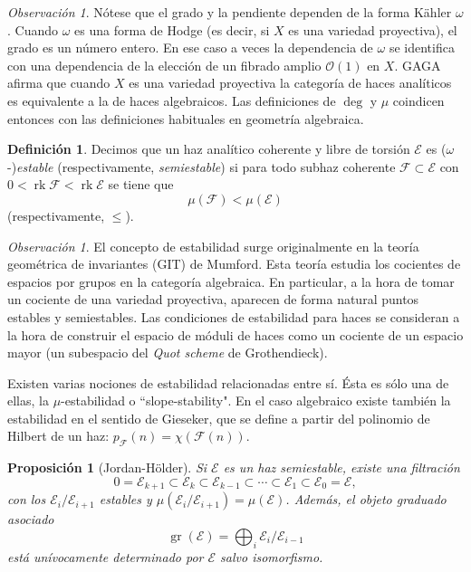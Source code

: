 \documentclass[12pt, a4paper]{amsart}
\newcommand\FF{\mathscr{F}}
\newcommand\EE{\mathscr{E}}
\newcommand\OO{\mathscr{O}}
\DeclareMathOperator\gr{gr}
\DeclareMathOperator\rk{rk}
\newtheorem{prop}[thm]{Proposición}
\theoremstyle{remark} \newtheorem{rmk}[thm]{Observación}
\theoremstyle{remark} \newtheorem{rmks}[thm]{Observaciones}
\theoremstyle{definition} \newtheorem{defn}[thm]{Definición}
\theoremstyle{definition} \newtheorem{ejs}[thm]{Ejemplos}
\theoremstyle{definition} \newtheorem{ej}[thm]{Ejemplo}
\begin{document}
\begin{rmk}
	Nótese que el grado y la pendiente dependen de la forma Kähler $\omega$. Cuando $\omega$ es una forma de Hodge  (es decir, si $X$ es una variedad proyectiva), el grado es un número entero. En ese caso a veces la dependencia de $\omega$ se identifica con una dependencia de la elección de un fibrado amplio $\OO(1)$ en $X$. GAGA afirma que cuando $X$ es una variedad proyectiva la categoría de haces analíticos es equivalente a la de haces algebraicos. Las definiciones de $\deg$ y $\mu$ coindicen entonces con las definiciones habituales en geometría algebraica.
\end{rmk}

\begin{defn}
	Decimos que un haz analítico coherente y libre de torsión $\EE$ es  ($\omega$-)\emph{estable} (respectivamente, \emph{semiestable}) si para todo subhaz coherente $\FF \subset \EE$ con  $0<\rk \FF < \rk \EE$ se tiene que
	 \begin{equation*}
		 \mu(\FF)< \mu(\EE)
	\end{equation*} 
	(respectivamente, $\leq$).
\end{defn}

\begin{rmk}
	El concepto de estabilidad surge originalmente en la teoría geométrica de invariantes (GIT) de Mumford. Esta teoría estudia los cocientes de espacios por grupos en la categoría algebraica. En particular, a la hora de tomar un cociente de una variedad proyectiva, aparecen de forma natural puntos estables y semiestables. Las condiciones de estabilidad para haces se consideran a la hora de construir el espacio de móduli de haces como un cociente de un espacio mayor (un subespacio del \emph{Quot scheme} de Grothendieck).

	Existen varias nociones de estabilidad relacionadas entre sí. Ésta es sólo una de ellas, la $\mu$-estabilidad o ``slope-stability". En el caso algebraico existe también la estabilidad en el sentido de Gieseker, que se define a partir del polinomio de Hilbert de un haz: $p_\FF(n)=\chi(\FF(n))$. 
\end{rmk}
		
\begin{prop}[Jordan-Hölder]
	Si $\EE$ es un haz semiestable, existe una filtración
	\begin{equation*}
	0=\EE_{k+1}\subset \EE_k \subset \EE_{k-1}\subset \cdots \subset \EE_1 \subset \EE_0=\EE,
	\end{equation*} 
	con los $\EE_i/\EE_{i+1}$ estables y $\mu(\EE_i/\EE_{i+1})=\mu(\EE)$. Además, el \emph{objeto graduado asociado}
	\begin{equation*}
		\gr(\EE) = \bigoplus_i \EE_i/\EE_{i-1}
	\end{equation*} 
	está unívocamente determinado por $\EE$ salvo isomorfismo.
\end{prop}
\end{document}
